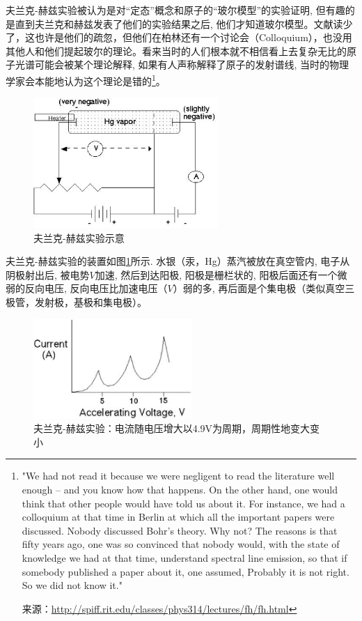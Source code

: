 夫兰克-赫兹实验被认为是对“定态”概念和原子的“玻尔模型”的实验证明,
但有趣的是直到夫兰克和赫兹发表了他们的实验结果之后,
他们才知道玻尔模型。文献读少了，这也许是他们的疏忽，但他们在柏林还有一个讨论会（Colloquium），也没用其他人和他们提起玻尔的理论。看来当时的人们根本就不相信看上去复杂无比的原子光谱可能会被某个理论解释,
如果有人声称解释了原子的发射谱线,
当时的物理学家会本能地认为这个理论是错的\footnote{"We had not read it because we were negligent to read the literature
well enough -- and you know how that happens. On the other hand, one
would think that other people would have told us about it. For
instance, we had a colloquium at that time in Berlin at which all
the important papers were discussed. Nobody discussed Bohr's theory.
Why not? The reasons is that fifty years ago, one was so convinced
that nobody would, with the state of knowledge we had at that time,
understand spectral line emission, so that if somebody published a
paper about it, one assumed, Probably it is not right. So we did not
know it."

来源：\url{http://spiff.rit.edu/classes/phys314/lectures/fh/fh.html}}。

\begin{figure}[h]
\begin{center}
\includegraphics[clip,width=7cm]{BohrModel/4-3.ps}
\caption{夫兰克-赫兹实验示意}\label{Feank-Hertz_experiment_device}
\end{center}
\end{figure}

夫兰克-赫兹实验的装置如图\ref{Feank-Hertz_experiment_device}所示.
水银（汞，Hg）蒸汽被放在真空管内, 电子从阴极射出后, 被电势$V$加速,
然后到达阳极, 阳极是栅栏状的, 阳极后面还有一个微弱的反向电压,
反向电压比加速电压（$V$）弱的多,
再后面是个集电极（类似真空三极管，发射极，基极和集电极）。

\begin{figure}[h]
\begin{center}
\includegraphics[clip,width=6cm]{BohrModel/4-4.ps}
\caption{夫兰克-赫兹实验：电流随电压增大以4.9V为周期，周期性地变大变小}\label{Frank-Hertz_experiment_result}
\end{center}
\end{figure}

